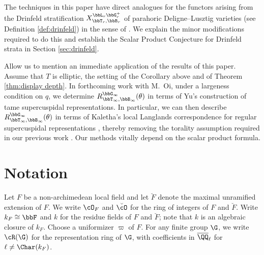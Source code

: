 The techniques in this paper have direct analogues for the functors arising from the Drinfeld stratification $X_{\bbT_r,\bbB_r}^{\bbL_r\bbG_r^+}$ of parahoric Deligne--Lusztig varieties (see Definition \ref{def:drinfeld}) in the sense of \cite{CI21-SM}. We explain the minor modifications required to do this and  establish the Scalar Product Conjecture for Drinfeld strata in Section \ref{sec:drinfeld}.


Allow us to mention an immediate application of the results of this paper. Assume that $T$ is elliptic, the setting of the Corollary above and of Theorem \ref{thm:display depth}. In forthcoming work with M.\ Oi, under a largeness condition on $q$, we determine $R_{\bbT_\infty,\bbB_\infty}^{\bbG_\infty}(\theta)$ in terms of Yu's construction \cite{Yu01} of tame supercuspidal representations. In particular, we can then describe $R_{\bbT_\infty,\bbB_\infty}^{\bbG_\infty}(\theta)$ in terms of Kaletha's local Langlands correspondence for regular supercuspidal representations \cite{Kal19}, thereby removing the torality assumption required in our previous work \cite{CO21}. Our methods vitally depend on the scalar product formula. 





\setcounter{tocdepth}{1}

\tableofcontents


\section{Notation}\label{sec:notation}

Let $F$ be a non-archimedean local field and let $\breve F$ denote the maximal unramified extension of $F$. We write $\cO_F$ and $\breve \cO$ for the ring of integers of $F$ and $\breve F$. Write $k_F \cong \bbF$ and $k$ for the residue fields of $F$ and $\breve F$; note that $k$ is an algebraic closure of $k_F$. Choose a uniformizer $\varpi$ of $F$. For any finite group $\G$, we write $\cR(\G)$ for the representation ring of $\G$, with coefficients in $\overline \QQ_\ell$ for $\ell \neq \Char(k_F)$.


